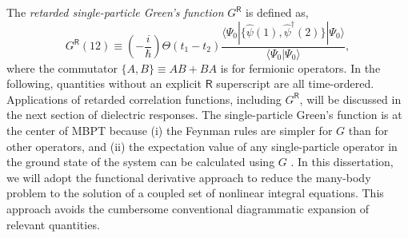 \documentclass[11pt, oneside]{article}          %
\begin{document}
The \emph{retarded single-particle Green's function} $G^{\mathsf{R}}$ is defined as,
\begin{equation}
  \label{eq:retarded_GreenFunction}
  G^{\mathsf{R}}(12) \equiv (-\frac{i}{\hbar}) \Theta(t_1 - t_2) \frac{ \langle \Psi_0 | \{ \hat{\psi}(1), \hat{\psi}^{\dagger}(2) \} | \Psi_0 \rangle} {\langle \Psi_0 | \Psi_0 \rangle},
\end{equation}
where the commutator $\{ A, B \} \equiv AB + BA$ is for fermionic operators. In the following, quantities without an explicit $\mathsf{R}$ superscript are all time-ordered. Applications of retarded correlation functions, including $G^{\mathsf{R}}$, will be discussed in the next section of dielectric responses. The single-particle Green's function is at the center of MBPT because (i) the Feynman rules are simpler for $G$ than for other operators, and (ii) the expectation value of any single-particle operator in the ground state of the system can be calculated using $G$ \cite{fetter2012quantum}. In this dissertation, we will adopt the functional derivative approach \cite{baym1961field, hedin1970effects, strinati1988application} to reduce the many-body problem to the solution of a coupled set of nonlinear integral equations. This approach avoids the cumbersome conventional diagrammatic expansion of relevant quantities.
\end{document}
